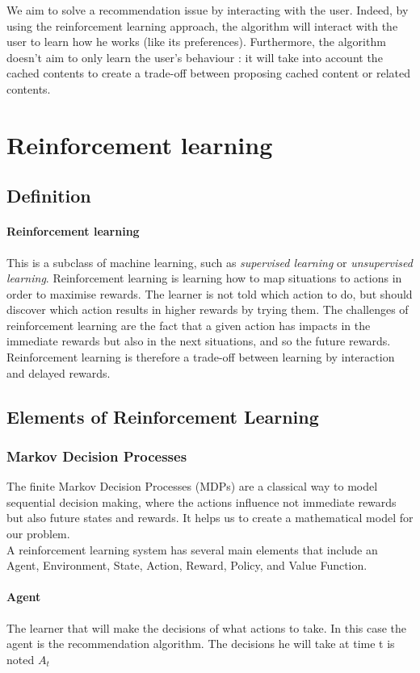 \documentclass[a4paper]{article}
\begin{document}
We aim to solve a recommendation issue by interacting with the user. Indeed, by using the reinforcement learning approach, the algorithm will interact with the user to learn how he works (like its preferences). Furthermore, the algorithm doesn't aim to only learn the user's behaviour : it will take into account the cached contents to create a trade-off between proposing cached content or related contents.

\section{Reinforcement learning}

\subsection{Definition}

\paragraph{Reinforcement learning} This is a subclass of machine learning, such as \textit{supervised learning} or \textit{unsupervised learning}. Reinforcement learning is learning how to map situations to actions in order to maximise rewards. The learner is not told which action to do, but should discover which action results in higher rewards by trying them. The challenges of reinforcement learning are the fact that a given action has impacts in the immediate rewards but also in the next situations, and so the future rewards. Reinforcement learning is therefore a trade-off between learning by interaction and delayed rewards. 

\subsection{Elements of Reinforcement Learning}
	\subsubsection{Markov Decision Processes}
	The finite Markov Decision Processes (MDPs) are a classical way to model sequential decision making, where the actions influence not immediate rewards but also future states and rewards. It helps us to create a mathematical model for our problem. \\
A reinforcement learning system has several main elements that include an Agent, Environment, State, Action, Reward, Policy, and Value Function.
\paragraph{Agent}The learner that will make the decisions of what actions to take. In this case the agent is the recommendation algorithm. The decisions he will take at time t is noted $A_t$
\end{document}
